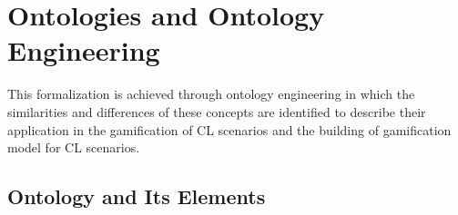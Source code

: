 \newpage
\section{Ontologies and Ontology Engineering}
\label{sec:ontologies-and-ontology-engineering}

This formalization is achieved through ontology engineering in which the similarities and differences of these concepts are identified to describe their application in the gamification of CL scenarios and the building of gamification model for CL scenarios.




\subsection{Ontology and Its Elements}
\label{subsec:ontologies}



